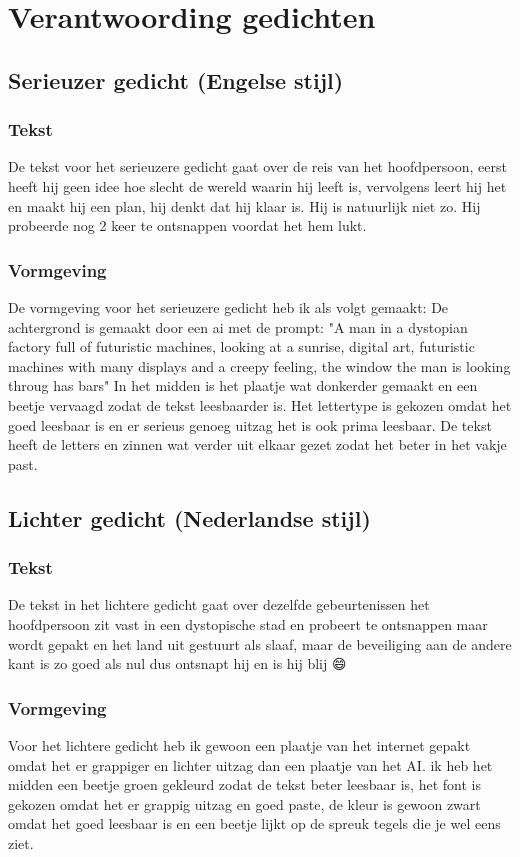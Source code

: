 \documentclass[11pt]{article}
\date{\today}
\title{}
\begin{document}
\tableofcontents

\section{Verantwoording gedichten}
\label{sec:org658b3c4}
\subsection{Serieuzer gedicht (Engelse stijl)}
\label{sec:org760e965}
\subsubsection{Tekst}
\label{sec:org399ab76}
De tekst voor het serieuzere gedicht gaat over de reis van het hoofdpersoon, eerst heeft hij geen idee hoe slecht de wereld waarin hij leeft is, vervolgens leert hij het en maakt hij een plan, hij denkt dat hij klaar is. Hij is natuurlijk niet zo. Hij probeerde nog 2 keer te ontsnappen voordat het hem lukt.
\subsubsection{Vormgeving}
\label{sec:orgbed87c5}
De vormgeving voor het serieuzere gedicht heb ik als volgt gemaakt: De achtergrond is gemaakt door een ai met de prompt: "A man in a dystopian factory full of futuristic machines, looking at a sunrise, digital art, futuristic machines with many displays and a creepy feeling, the window the man is looking throug has bars" In het midden is het plaatje wat donkerder gemaakt en een beetje vervaagd zodat de tekst leesbaarder is. Het lettertype is gekozen omdat het goed leesbaar is en er serieus genoeg uitzag het is ook prima leesbaar. De tekst heeft de letters en zinnen wat verder uit elkaar gezet zodat het beter in het vakje past.
\subsection{Lichter gedicht (Nederlandse stijl)}
\label{sec:org43d8ab0}
\subsubsection{Tekst}
\label{sec:org5b7dd5b}
De tekst in het lichtere gedicht gaat over dezelfde gebeurtenissen het hoofdpersoon zit vast in een dystopische stad en probeert te ontsnappen maar wordt gepakt en het land uit gestuurt als slaaf, maar de beveiliging aan de andere kant is zo goed als nul dus ontsnapt hij en is hij blij 😄
\subsubsection{Vormgeving}
\label{sec:orgffa90d0}
Voor het lichtere gedicht heb ik gewoon een plaatje van het internet gepakt omdat het er grappiger en lichter uitzag dan een plaatje van het AI. ik heb het midden een beetje groen gekleurd zodat de tekst beter leesbaar is, het font is gekozen omdat het er grappig uitzag en goed paste, de kleur is gewoon zwart omdat het goed leesbaar is en een beetje lijkt op de spreuk tegels die je wel eens ziet.
\end{document}
